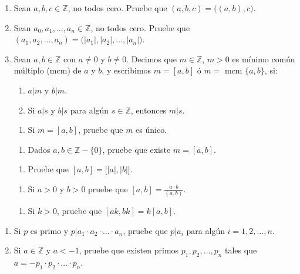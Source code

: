 \documentclass[11pt]{article}
\newcommand{\Z}{\mathbb{Z}}
\begin{document}
\begin{enumerate}[start=31]
  \item Sean $a,b,c\in\Z$, no todos cero. Pruebe que $(a,b,c)=\big( (a,b),c \big)$.
  \item Sean $a_0,a_1,\dots,a_n \in \Z$, no todos cero. Pruebe que $(a_1,a_2,\dots,a_n)=\big(|a_1|,|a_2|,\dots,|a_n|\big)$.
  \item Sean $a,b \in \Z$ con $a\neq 0$ y $b \neq 0$. Decimos que $m\in\Z$, $m>0$ es mínimo común múltiplo (mcm) de $a$ y $b$, y escribimos $m=[a,b]$ ó $m=$ mcm $\{a,b\}$, si:
  \begin{enumerate}[label=\roman*)]
    \item $a|m$ y $b|m$.
    \item Si $a|s$ y $b|s$ para algún $s\in\Z$, entonces $m|s$.
  \end{enumerate}
    \begin{enumerate}[label=33.1]
      \item Si $m=[a,b]$, pruebe que $m$ es único. 
    \end{enumerate}
    \begin{enumerate}[label=33.2]
      \item Dados $a,b\in \Z-\{0\}$, pruebe que existe $m=[a,b]$.
    \end{enumerate}
    \begin{enumerate}[label=33.3]
      \item Pruebe que $[a,b]=\big[|a|,|b| \big]$.
    \end{enumerate}
    \begin{enumerate}[label=33.4]
      \item Si $a>0$ y $b>0$ pruebe que $[a,b]=\frac{a \cdot b}{(a,b)}$.
    \end{enumerate}
    \begin{enumerate}[label=33.5]
      \item Si $k>0$, pruebe que $[ak,bk]=k[a,b]$.
    \end{enumerate}
\end{enumerate}

\begin{enumerate}[start=37]
  \item Si $p$ es primo y $p|a_1 \cdot a_2 \cdot \dots \cdot a_n$, pruebe que $p|a_i$ para algún $i=1,2, \dots, n$.
  \item Si $a\in \Z$ y $a<-1$, pruebe que existen primos $p_1,p_2,\dots,p_n$ tales que $a=-p_1\cdot p_2 \cdot \dots \cdot p_n$.
\end{enumerate}
\end{document}
